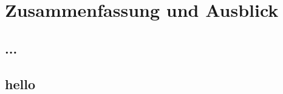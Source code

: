 \chapter{Zusammenfassung und Ausblick}
\section{...}
\blindtext[10]
\newpage
\section{hello}
\blindtext[10]
